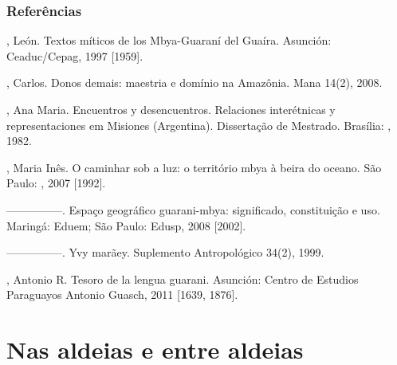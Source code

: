 {{\section{Referências}

\begin{Parskip}
, León. Textos míticos de los Mbya-Guaraní del Guaíra. Asunción:
Ceaduc/Cepag, 1997 [1959].

, Carlos. Donos demais: maestria e domínio na Amazônia. Mana
14(2), 2008. 

 , Ana Maria. Encuentros y desencuentros. Relaciones
interétnicas y representaciones em Misiones (Argentina). Dissertação de
Mestrado. Brasília: , 1982.

, Maria Inês.  O caminhar sob a luz: o território mbya à beira do
oceano. São Paulo: , 2007 [1992].

—————. Espaço geográfico guarani-mbya: significado, constituição e uso.
Maringá: Eduem; São Paulo: Edusp, 2008 [2002].

—————. Yvy marãey. Suplemento Antropológico 34(2), 1999.

, Antonio R. Tesoro de la lengua guarani. Asunción: Centro de
Estudios Paraguayos Antonio Guasch, 2011 [1639, 1876].
\end{Parskip}

\part{Nas aldeias e entre aldeias}

}}
